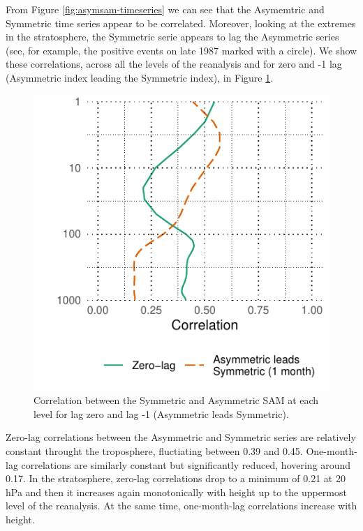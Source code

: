 \documentclass[]{ametsocV5}
\begin{document}
From Figure \ref{fig:asymsam-timeseries} we can see that the Asymemtric
and Symmetric time series appear to be correlated. Moreover, looking at
the extremes in the stratosphere, the Symmetric serie appears to lag the
Asymmetric series (see, for example, the positive events on late 1987
marked with a circle). We show these correlations, across all the levels
of the reanalysis and for zero and -1 lag (Asymmetric index leading the
Symmetric index), in Figure \ref{fig:cor-lev}.

\begin{figure}
\includegraphics{cor-lev-1} \caption[Correlation between the Symmetric and Asymmetric SAM at each level for lag zero and lag -1 (Asymmetric leads Symmetric)]{Correlation between the Symmetric and Asymmetric SAM at each level for lag zero and lag -1 (Asymmetric leads Symmetric).}\label{fig:cor-lev}
\end{figure}

Zero-lag correlations between the Asymmetric and Symmetric series are
relatively constant throught the troposphere, fluctiating between 0.39
and 0.45. One-month-lag correlations are similarly constant but
significantly reduced, hovering around 0.17. In the stratosphere,
zero-lag correlations drop to a minimum of 0.21 at 20 hPa and then it
increases again monotonically with height up to the uppermost level of
the reanalysis. At the same time, one-month-lag correlations increase
with height.
\end{document}
